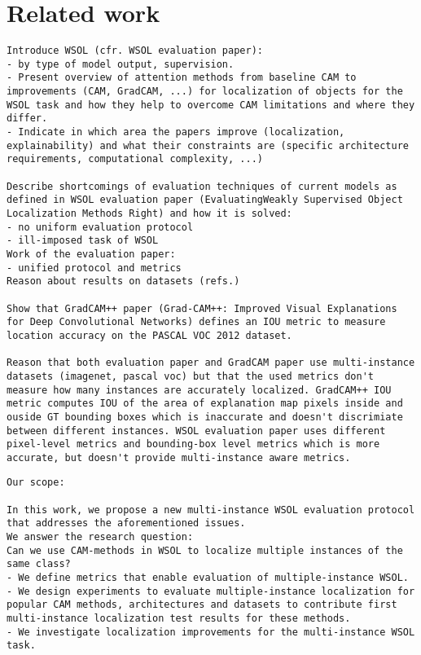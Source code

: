 \chapter{Related work}


\begin{verbatim}
Introduce WSOL (cfr. WSOL evaluation paper):
- by type of model output, supervision.
- Present overview of attention methods from baseline CAM to improvements (CAM, GradCAM, ...) for localization of objects for the WSOL task and how they help to overcome CAM limitations and where they differ.
- Indicate in which area the papers improve (localization, explainability) and what their constraints are (specific architecture requirements, computational complexity, ...)

Describe shortcomings of evaluation techniques of current models as defined in WSOL evaluation paper (EvaluatingWeakly Supervised Object Localization Methods Right) and how it is solved:
- no uniform evaluation protocol
- ill-imposed task of WSOL
Work of the evaluation paper: 
- unified protocol and metrics 
Reason about results on datasets (refs.)

Show that GradCAM++ paper (Grad-CAM++: Improved Visual Explanations for Deep Convolutional Networks) defines an IOU metric to measure location accuracy on the PASCAL VOC 2012 dataset.

Reason that both evaluation paper and GradCAM paper use multi-instance datasets (imagenet, pascal voc) but that the used metrics don't measure how many instances are accurately localized. GradCAM++ IOU metric computes IOU of the area of explanation map pixels inside and ouside GT bounding boxes which is inaccurate and doesn't discrimiate between different instances. WSOL evaluation paper uses different pixel-level metrics and bounding-box level metrics which is more accurate, but doesn't provide multi-instance aware metrics.
\end{verbatim}

\begin{verbatim}
Our scope:

In this work, we propose a new multi-instance WSOL evaluation protocol that addresses the aforementioned issues. 
We answer the research question:
Can we use CAM-methods in WSOL to localize multiple instances of the same class?
- We define metrics that enable evaluation of multiple-instance WSOL.
- We design experiments to evaluate multiple-instance localization for popular CAM methods, architectures and datasets to contribute first multi-instance localization test results for these methods.
- We investigate localization improvements for the multi-instance WSOL task.
\end{verbatim}